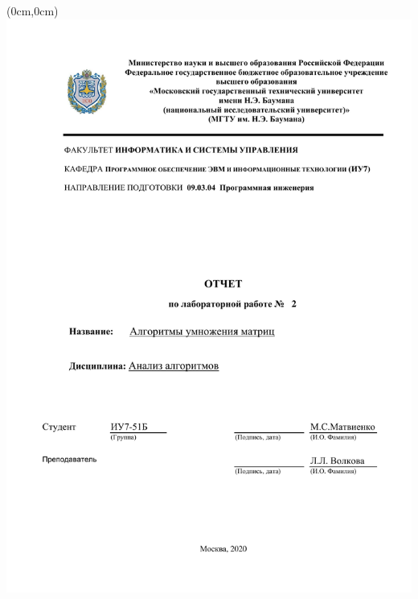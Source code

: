 \documentclass[12pt,a4paper]{article}
\begin{document}
	\begin{titlepage}
		\begin{textblock*}{13cm}(0cm,0cm)
			\includegraphics{title_02}
		\end{textblock*}
	\end{titlepage}
\hspace{0pt}
\clearpage

\tableofcontents
\clearpage

\end{document}
